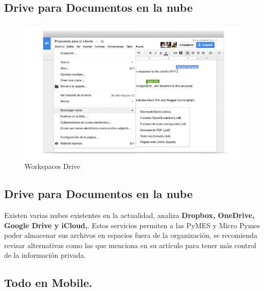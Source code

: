 \documentclass[
  letterpaper,
  DIV=11,
  numbers=noendperiod]{scrartcl}
\begin{document}
\hypertarget{drive-para-documentos-en-la-nube}{%
\subsection{Drive para Documentos en la
nube}\label{drive-para-documentos-en-la-nube}}

\begin{figure}

{\centering \includegraphics{media/drive.png}

}

\caption{Workspaces Drive}

\end{figure}

\hypertarget{drive-para-documentos-en-la-nube-1}{%
\subsection{Drive para Documentos en la
nube}\label{drive-para-documentos-en-la-nube-1}}

Existen varias nubes existentes en la actualidad,
\textcite{martiGoogleDriveVs2021} analiza \textbf{Dropbox, OneDrive,
Google Drive y iCloud,}. Estos servicios permiten a las PyMES y Micro
Pymes poder almacenar sus archivos en espacios fuera de la organización,
se recomienda revisar alternativas como las que menciona en su artículo
\textcite{RafaelBonifazSoftware2020} para tener más control de la
información privada.

\hypertarget{todo-en-mobile.}{%
\subsection{Todo en Mobile.}\label{todo-en-mobile.}}
\end{document}
